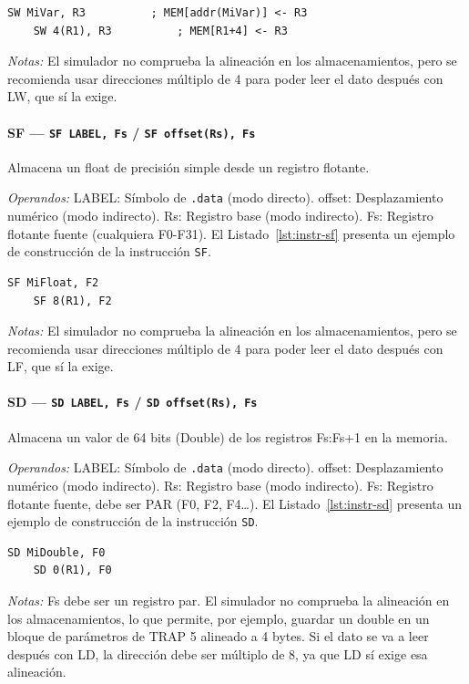 \documentclass[../main.tex]{subfiles}
\begin{document}
\begin{lstlisting}[caption={SW},label={lst:instr-sw}]
	SW MiVar, R3          ; MEM[addr(MiVar)] <- R3
	SW 4(R1), R3          ; MEM[R1+4] <- R3
\end{lstlisting}
\textit{Notas:} El simulador no comprueba la alineación en los almacenamientos, pero se recomienda usar direcciones múltiplo de 4 para poder leer el dato después con LW, que sí la exige.

\paragraph*{SF --- \texttt{SF LABEL, Fs} / \texttt{SF offset(Rs), Fs}}
Almacena un float de precisión simple desde un registro flotante.

\textit{Operandos:} LABEL: Símbolo de \texttt{.data} (modo directo). offset: Desplazamiento numérico (modo indirecto). Rs: Registro base (modo indirecto). Fs: Registro flotante fuente (cualquiera F0-F31).
El Listado~\ref{lst:instr-sf} presenta un ejemplo de construcción de la instrucción \texttt{SF}.

\begin{lstlisting}[caption={SF},label={lst:instr-sf}]
	SF MiFloat, F2
	SF 8(R1), F2
\end{lstlisting}
\textit{Notas:} El simulador no comprueba la alineación en los almacenamientos, pero se recomienda usar direcciones múltiplo de 4 para poder leer el dato después con LF, que sí la exige.

\paragraph*{SD --- \texttt{SD LABEL, Fs} / \texttt{SD offset(Rs), Fs}}
Almacena un valor de 64 bits (Double) de los registros Fs:Fs+1 en la memoria.

\textit{Operandos:} LABEL: Símbolo de \texttt{.data} (modo directo). offset: Desplazamiento numérico (modo indirecto). Rs: Registro base (modo indirecto). Fs: Registro flotante fuente, debe ser PAR (F0, F2, F4\ldots).
El Listado~\ref{lst:instr-sd} presenta un ejemplo de construcción de la instrucción \texttt{SD}.

\begin{lstlisting}[caption={SD},label={lst:instr-sd}]
	SD MiDouble, F0
	SD 0(R1), F0
\end{lstlisting}
\textit{Notas:} Fs debe ser un registro par. El simulador no comprueba la alineación en los almacenamientos, lo que permite, por ejemplo, guardar un double en un bloque de parámetros de TRAP 5 alineado a 4 bytes. Si el dato se va a leer después con LD, la dirección debe ser múltiplo de 8, ya que LD sí exige esa alineación.
\end{document}
